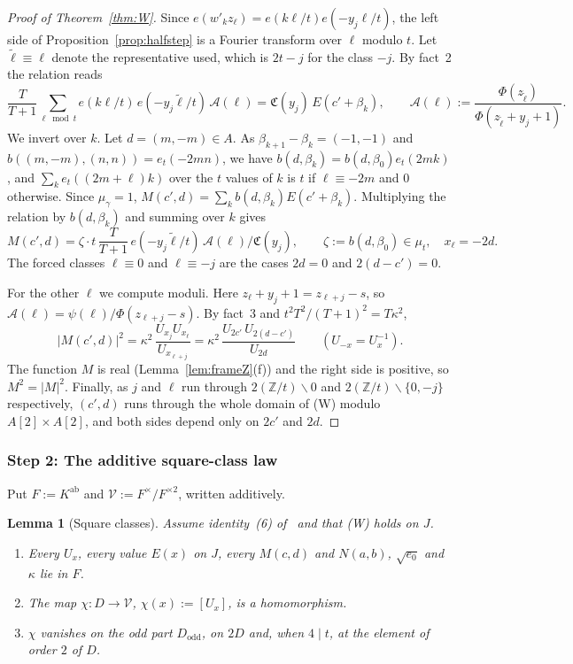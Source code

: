 \documentclass[11pt]{amsart}
\numberwithin{equation}{section}
\theoremstyle{plain}
\newtheorem{lemma}[theorem]{Lemma}
\theoremstyle{definition}
\theoremstyle{remark}
\begin{document}
\begin{proof}[Proof of Theorem~\ref{thm:W}]
Since \(e(w'_kz_\ell)=e(k\ell/t)e(-y_j\ell/t)\), the left side of Proposition~\ref{prop:halfstep} is a Fourier transform over \(\ell\) modulo \(t\). Let \(\tilde\ell\equiv\ell\) denote the representative used, which is \(2t-j\) for the class \(-j\). By fact~2 the relation reads
\[\frac{T}{T+1}\sum_{\ell\bmod t}e(k\ell/t)\,e(-y_j\tilde\ell/t)\,\mathcal A(\ell)=\mathfrak C(y_j)\,E(c'+\beta_k),\qquad\mathcal A(\ell):=\frac{\Phi(z_{\tilde\ell})}{\Phi(z_{\tilde\ell}+y_j+1)}.\]
We invert over \(k\). Let \(d=(m,-m)\in A\). As \(\beta_{k+1}-\beta_k=(-1,-1)\) and \(b((m,-m),(n,n))=e_t(-2mn)\), we have \(b(d,\beta_k)=b(d,\beta_0)e_t(2mk)\), and \(\sum_ke_t((2m+\ell)k)\) over the \(t\) values of \(k\) is \(t\) if \(\ell\equiv-2m\) and \(0\) otherwise. Since \(\mu_\gamma=1\), \(M(c',d)=\sum_kb(d,\beta_k)E(c'+\beta_k)\). Multiplying the relation by \(b(d,\beta_k)\) and summing over \(k\) gives
\[M(c',d)=\zeta\cdot t\,\frac{T}{T+1}\,e(-y_j\tilde\ell/t)\,\mathcal A(\ell)/\mathfrak C(y_j),\qquad\zeta:=b(d,\beta_0)\in\mu_t,\quad x_\ell=-2d .\]
The forced classes \(\ell\equiv0\) and \(\ell\equiv-j\) are the cases \(2d=0\) and \(2(d-c')=0\).

For the other \(\ell\) we compute moduli. Here \(z_\ell+y_j+1=z_{\ell+j}-s\), so \(\mathcal A(\ell)=\psi(\ell)/\Phi(z_{\ell+j}-s)\). By fact~3 and \(t^2T^2/(T+1)^2=T\kappa^2\),
\[|M(c',d)|^2=\kappa^2\,\frac{U_{x_j}U_{x_\ell}}{U_{x_{\ell+j}}}=\kappa^2\,\frac{U_{2c'}\,U_{2(d-c')}}{U_{2d}}\qquad(U_{-x}=U_x^{-1}).\]
The function \(M\) is real (Lemma~\ref{lem:frameZ}(f)) and the right side is positive, so \(M^2=|M|^2\). Finally, as \(j\) and \(\ell\) run through \(2(\mathbb Z/t)\smallsetminus0\) and \(2(\mathbb Z/t)\smallsetminus\{0,-j\}\) respectively, \((c',d)\) runs through the whole domain of (W) modulo \(A[2]\times A[2]\), and both sides depend only on \(2c'\) and \(2d\).
\end{proof}

\subsubsection*{Step 2: The additive square-class law}

Put \(F:=K^{\mathrm{ab}}\) and \(\mathcal V:=F^\times/F^{\times2}\), written additively.

\begin{lemma}[Square classes]\label{lem:sqclass}
Assume identity~(6) of~\cite{RW} and that (W) holds on \(J\).
\begin{enumerate}
\item[(a)] Every \(U_x\), every value \(E(x)\) on \(J\), every \(M(c,d)\) and \(N(a,b)\), \(\sqrt{e_0}\) and \(\kappa\) lie in \(F\).
\item[(b)] The map \(\chi:D\to\mathcal V\), \(\chi(x):=[U_x]\), is a homomorphism.
\item[(c)] \(\chi\) vanishes on the odd part \(D_{\mathrm{odd}}\), on \(2D\) and, when \(4\mid t\), at the element of order \(2\) of \(D\).
\end{enumerate}
\end{lemma}
\end{document}
